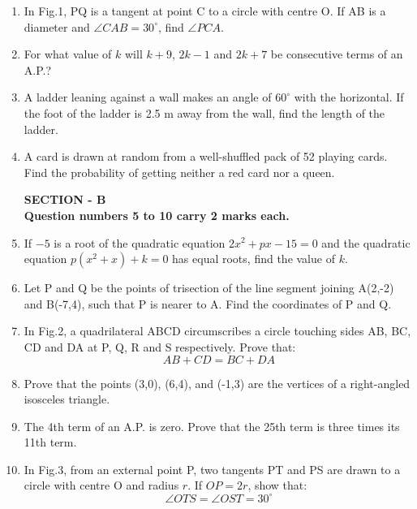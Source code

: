 \documentclass[12pt]{article}
\begin{document}
\begin{enumerate}[label=\arabic*.]

\item In Fig.1, PQ is a tangent at point C to a circle with centre O. If AB is a diameter and $\angle CAB = 30^\circ$, find $\angle PCA$.

\item For what value of $k$ will $k+9$, $2k-1$ and $2k+7$ be consecutive terms of an A.P.?

\item A ladder leaning against a wall makes an angle of $60^\circ$ with the horizontal. If the foot of the ladder is 2.5 m away from the wall, find the length of the ladder.

\item A card is drawn at random from a well-shuffled pack of 52 playing cards. Find the probability of getting neither a red card nor a queen.

\newpage

\begin{center}
{\fontsize{14pt}{16pt}\selectfont \textbf{SECTION - B}}\\[0.3cm]
\textbf{Question numbers 5 to 10 carry 2 marks each.}
\end{center}

\item If $-5$ is a root of the quadratic equation $2x^2 + px - 15 = 0$ and the quadratic equation $p(x^2+x)+k=0$ has equal roots, find the value of $k$.

\item Let P and Q be the points of trisection of the line segment joining A(2,-2) and B(-7,4), such that P is nearer to A. Find the coordinates of P and Q.

\item In Fig.2, a quadrilateral ABCD circumscribes a circle touching sides AB, BC, CD and DA at P, Q, R and S respectively. Prove that:
\[
AB + CD = BC + DA
\]

\item Prove that the points (3,0), (6,4), and (-1,3) are the vertices of a right-angled isosceles triangle.

\item The 4th term of an A.P. is zero. Prove that the 25th term is three times its 11th term.

\item In Fig.3, from an external point P, two tangents PT and PS are drawn to a circle with centre O and radius $r$. If $OP=2r$, show that:
\[
\angle OTS = \angle OST = 30^\circ
\]


\end{enumerate}
\end{document}
